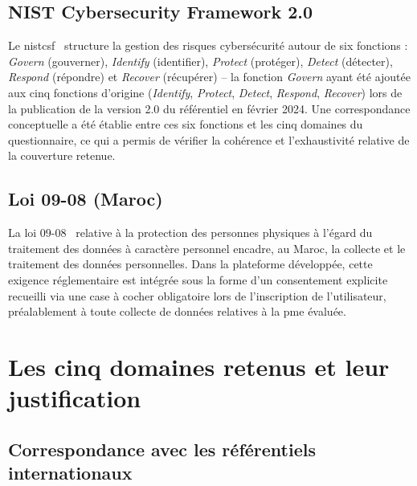 \subsection{NIST Cybersecurity Framework 2.0}

Le \gls{nistcsf}~\cite{nistcsf2024} structure la gestion des risques cybersécurité autour de six fonctions : \textit{Govern} (gouverner), \textit{Identify} (identifier), \textit{Protect} (protéger), \textit{Detect} (détecter), \textit{Respond} (répondre) et \textit{Recover} (récupérer) -- la fonction \textit{Govern} ayant été ajoutée aux cinq fonctions d'origine (\textit{Identify}, \textit{Protect}, \textit{Detect}, \textit{Respond}, \textit{Recover}) lors de la publication de la version 2.0 du référentiel en février 2024. Une correspondance conceptuelle a été établie entre ces six fonctions et les cinq domaines du questionnaire, ce qui a permis de vérifier la cohérence et l'exhaustivité relative de la couverture retenue.

\subsection{Loi 09-08 (Maroc)}

La loi 09-08~\cite{loi0908} relative à la protection des personnes physiques à l'égard du traitement des données à caractère personnel encadre, au Maroc, la collecte et le traitement des données personnelles. Dans la plateforme développée, cette exigence réglementaire est intégrée sous la forme d'un consentement explicite recueilli via une case à cocher obligatoire lors de l'inscription de l'utilisateur, préalablement à toute collecte de données relatives à la \gls{pme} évaluée.


\section{Les cinq domaines retenus et leur justification}
\label{sec:domaines}

\subsection{Correspondance avec les référentiels internationaux}

